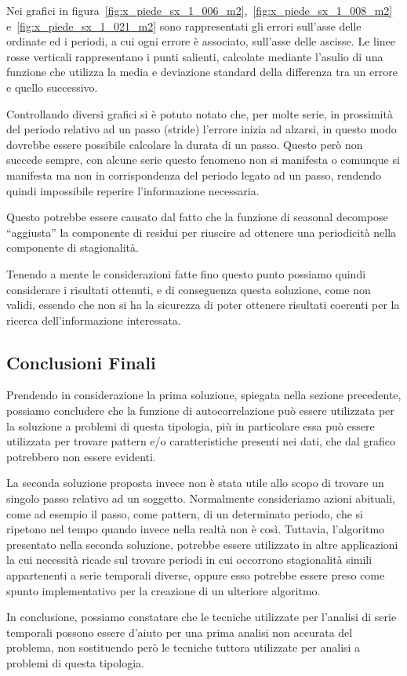 Nei grafici in figura~\ref*{fig:x_piede_sx_1_006_m2},~\ref*{fig:x_piede_sx_1_008_m2} e~\ref*{fig:x_piede_sx_1_021_m2}
sono rappresentati gli errori sull'asse delle ordinate ed i periodi, a cui ogni errore è associato,
sull'asse delle ascisse. Le linee rosse verticali rappresentano i punti salienti, calcolate mediante
l'asulio di una funzione che utilizza la media e deviazione standard della differenza tra un errore 
e quello successivo.

Controllando diversi grafici si è potuto notato che, per molte serie, in prossimità del periodo 
relativo ad un passo (stride) l'errore inizia ad alzarsi, in questo modo dovrebbe essere possibile 
calcolare la durata di un passo.
Questo però non succede sempre, con alcune serie questo fenomeno non si manifesta o comunque
si manifesta ma non in corrispondenza del periodo legato ad un passo, rendendo quindi impossibile
reperire l'informazione necessaria.

Questo potrebbe essere causato dal fatto che la funzione di seasonal decompose ``aggiusta'' la componente
di residui per riuscire ad ottenere una periodicità nella componente di stagionalità.

Tenendo a mente le considerazioni fatte fino questo punto possiamo quindi considerare i risultati ottenuti,
e di conseguenza questa soluzione, come non validi, essendo che non si ha la sicurezza di poter
ottenere risultati coerenti per la ricerca dell'informazione interessata.



\subsection{Conclusioni Finali}
Prendendo in considerazione la prima soluzione, spiegata nella sezione precedente, possiamo concludere
che la funzione di autocorrelazione può essere utilizzata per la soluzione a problemi di questa tipologia,
più in particolare essa può essere utilizzata per trovare pattern e/o caratteristiche presenti nei dati, 
che dal grafico potrebbero non essere evidenti.

La seconda soluzione proposta invece non è stata utile allo scopo di trovare un singolo passo 
relativo ad un soggetto. Normalmente consideriamo azioni abituali, come ad esempio il passo,
come pattern, di un determinato periodo, che si ripetono nel tempo quando invece nella realtà non 
è così. 
Tuttavia, l'algoritmo presentato nella seconda soluzione, potrebbe essere utilizzato 
in altre applicazioni la cui necessità ricade sul trovare periodi in cui occorrono stagionalità simili 
appartenenti a serie temporali diverse, oppure esso potrebbe essere preso come spunto implementativo per la creazione di un ulteriore 
algoritmo.

In conclusione, possiamo constatare che le tecniche utilizzate per l'analisi di serie temporali
possono essere d'aiuto per una prima analisi non accurata del problema,
non sostituendo però le tecniche tuttora utilizzate per analisi a problemi di questa tipologia.


